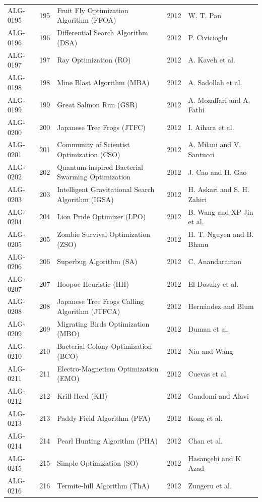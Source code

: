 \documentclass[8pt]{article}
\begin{document}
\begin{landscape}
\begin{longtable}{P{1.7cm}rP{10.0cm}rP{7.2cm}}
ALG-0195 & 195 & Fruit Fly Optimization Algorithm (FFOA) & 2012 & W. T. Pan \\
ALG-0196 & 196 & Differential Search Algorithm (DSA) & 2012 & P. Civicioglu \\
ALG-0197 & 197 & Ray Optimization (RO) & 2012 & A. Kaveh et al. \\
ALG-0198 & 198 & Mine Blast Algorithm (MBA) & 2012 & A. Sadollah et al. \\
ALG-0199 & 199 & Great Salmon Run (GSR) & 2012 & A. Mozaffari and A. Fathi \\
ALG-0200 & 200 & Japanese Tree Frogs (JTFC) & 2012 & I. Aihara et al. \\
ALG-0201 & 201 & Community of Scientist Optimization (CSO) & 2012 & A. Milani and V. Santucci \\
ALG-0202 & 202 & Quantum-inspired Bacterial Swarming Optimization & 2012 & J. Cao and H. Gao \\
ALG-0203 & 203 & Intelligent Gravitational Search Algorithm (IGSA) & 2012 & H. Askari and S. H. Zahiri \\
ALG-0204 & 204 & Lion Pride Optimizer (LPO) & 2012 & B. Wang and XP Jin et al. \\
ALG-0205 & 205 & Zombie Survival Optimization (ZSO) & 2012 & H. T. Nguyen and B. Bhanu \\
ALG-0206 & 206 & Superbug Algorithm (SA) & 2012 & C. Anandaraman \\
ALG-0207 & 207 & Hoopoe Heuristic (HH) & 2012 & El-Dosuky et al. \\
ALG-0208 & 208 & Japanese Tree Frogs Calling Algorithm (JTFCA) & 2012 & Hernández and Blum \\
ALG-0209 & 209 & Migrating Birds Optimization (MBO) & 2012 & Duman et al. \\
ALG-0210 & 210 & Bacterial Colony Optimization (BCO) & 2012 & Niu and Wang \\
ALG-0211 & 211 & Electro-Magnetism Optimization (EMO) & 2012 & Cuevas et al. \\
ALG-0212 & 212 & Krill Herd (KH) & 2012 & Gandomi and Alavi \\
ALG-0213 & 213 & Paddy Field Algorithm (PFA) & 2012 & Kong et al. \\
ALG-0214 & 214 & Pearl Hunting Algorithm (PHA) & 2012 & Chan et al. \\
ALG-0215 & 215 & Simple Optimization (SO) & 2012 & Hasançebi and K Azad \\
ALG-0216 & 216 & Termite-hill Algorithm (ThA) & 2012 & Zungeru et al. \\

\end{longtable}
\end{landscape}
\end{document}
